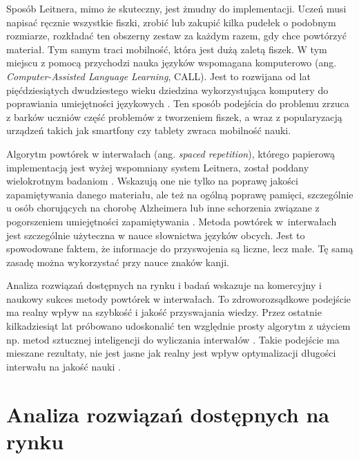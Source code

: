 \documentclass[a4paper,twoside,12pt]{book}
\newcommand{\obcy}[1]{\emph{#1}}
\newcommand{\english}[1]{{\selectlanguage{british}\obcy{#1}}}
\begin{document}
Sposób Leitnera, mimo że skuteczny, jest żmudny do implementacji. Uczeń musi napisać ręcznie wszystkie fiszki, zrobić lub zakupić kilka pudełek o podobnym rozmiarze, rozkładać ten obszerny zestaw za każdym razem, gdy chce powtórzyć materiał. Tym samym traci mobilność, która jest dużą zaletą fiszek. W tym miejscu z pomocą przychodzi nauka języków wspomagana komputerowo (ang. {\english{Computer-Assisted Language Learning}}, CALL). Jest to rozwijana od lat pięćdziesiątych dwudziestego wieku dziedzina wykorzystująca komputery do poprawiania umiejętności językowych \citep{bib:konferencjaCALLhistory}. Ten sposób podejścia do problemu zrzuca z barków uczniów część problemów z tworzeniem fiszek, a wraz z popularyzacją urządzeń takich jak smartfony czy tablety zwraca mobilność nauki. 

Algorytm powtórek w interwałach (ang. \english{spaced repetition}), którego papierową implementacją jest wyżej wspomniany system Leitnera, został poddany wielokrotnym badaniom \cite{bib:artykulAlzheimer,bib:artykulSpaced}. Wskazują one nie tylko na poprawę jakości zapamiętywania danego materiału, ale też na ogólną poprawę pamięci, szczególnie u osób chorujących na chorobę Alzheimera lub inne schorzenia związane z pogorszeniem umiejętności zapamiętywania \cite{bib:artykulAlzheimer}. Metoda powtórek w~interwałach jest szczególnie użyteczna w nauce słownictwa języków obcych. Jest to spowodowane faktem, że informacje do przyswojenia są liczne, lecz małe. Tę samą zasadę można wykorzystać przy nauce znaków kanji. 

Analiza rozwiązań dostępnych na rynku i badań wskazuje na komercyjny i naukowy sukces metody powtórek w interwałach. To zdroworozsądkowe podejście ma realny wpływ na szybkość i jakość przyswajania wiedzy. Przez ostatnie kilkadziesiąt lat próbowano udoskonalić ten względnie prosty algorytm z użyciem np. metod sztucznej inteligencji do wyliczania interwałów \cite{bib:internetNN}. Takie podejście ma mieszane rezultaty, nie jest jasne jak realny jest wpływ optymalizacji długości interwału na jakość nauki \cite[rozdział 6]{bib:ksiazkaEssays}.

\section{Analiza rozwiązań dostępnych na rynku}
\end{document}
